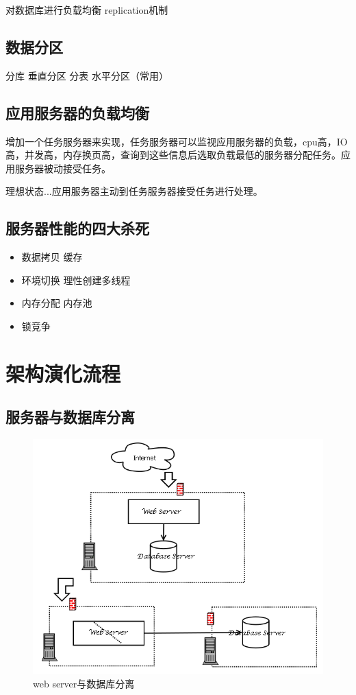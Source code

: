 \documentclass[UTF8,a4paper,12pt]{ctexbook}
\begin{document}
			对数据库进行负载均衡  replication机制
		\subsection{数据分区}
			分库  垂直分区
			分表  水平分区（常用）
			
		
		\subsection{应用服务器的负载均衡}
			增加一个任务服务器来实现，任务服务器可以监视应用服务器的负载，cpu高，IO高，并发高，内存换页高，查询到这些信息后选取负载最低的服务器分配任务。应用服务器被动接受任务。
			
			理想状态...应用服务器主动到任务服务器接受任务进行处理。
			
			
		\subsection{服务器性能的四大杀死}
			\begin{itemize}
				\item 数据拷贝  缓存
				\item 环境切换  理性创建多线程
				\item 内存分配  内存池
				\item 锁竞争
			\end{itemize}
	\section{架构演化流程}
		\subsection{服务器与数据库分离}
			\begin{figure}[ht]
				\centering
				\includegraphics[width=0.7\linewidth]{figures/server-database}
				\caption{web server与数据库分离}
				\label{fig:server-database}
			\end{figure}
			
\end{document}
